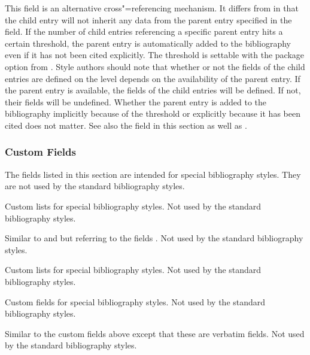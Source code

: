 \documentclass{ltxdockit}[2011/03/25]
\newcommand*{\biblatex}{\sty{biblatex}\xspace}
\begin{document}
\begin{fieldlist}
This field is an alternative cross"=referencing mechanism. It differs from  in that the child entry will not inherit any data from the parent entry specified in the  field. If the number of child entries referencing a specific parent entry hits a certain threshold, the parent entry is automatically added to the bibliography even if it has not been cited explicitly. The threshold is settable with the  package option from . Style authors should note that whether or not the  fields of the child entries are defined on the \biblatex level depends on the availability of the parent entry. If the parent entry is available, the  fields of the child entries will be defined. If not, their  fields will be undefined. Whether the parent entry is added to the bibliography implicitly because of the threshold or explicitly because it has been cited does not matter. See also the  field in this section as well as .

\end{fieldlist}

\subsubsection{Custom Fields}
\label{bib:fld:ctm}

The fields listed in this section are intended for special bibliography styles. They are not used by the standard bibliography styles.

\begin{fieldlist}


Custom lists for special bibliography styles. Not used by the standard bibliography styles.


Similar to  and  but referring to the fields . Not used by the standard bibliography styles.


Custom lists for special bibliography styles. Not used by the standard bibliography styles.


Custom fields for special bibliography styles. Not used by the standard bibliography styles.


Similar to the custom fields above except that these are verbatim fields. Not used by the standard bibliography styles.

\end{fieldlist}
\end{document}
